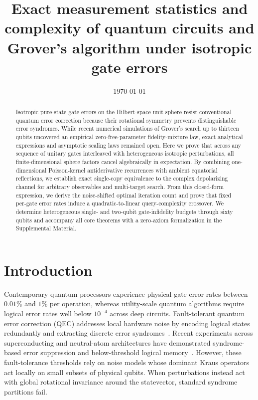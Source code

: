 \title{Exact measurement statistics and complexity of quantum circuits and Grover's algorithm under isotropic gate errors}

\date{\today}

\begin{abstract}
Isotropic pure-state gate errors on the Hilbert-space unit sphere resist conventional quantum error correction because their rotational symmetry prevents distinguishable error syndromes. While recent numerical simulations of Grover's search up to thirteen qubits uncovered an empirical zero-free-parameter fidelity-mixture law, exact analytical expressions and asymptotic scaling laws remained open. Here we prove that across any sequence of unitary gates interleaved with heterogeneous isotropic perturbations, all finite-dimensional sphere factors cancel algebraically in expectation. By combining one-dimensional Poisson-kernel antiderivative recurrences with ambient equatorial reflections, we establish exact single-copy equivalence to the complex depolarizing channel for arbitrary observables and multi-target search. From this closed-form expression, we derive the noise-shifted optimal iteration count and prove that fixed per-gate error rates induce a quadratic-to-linear query-complexity crossover. We determine heterogeneous single- and two-qubit gate-infidelity budgets through sixty qubits and accompany all core theorems with a zero-axiom formalization in the Supplemental Material.
\end{abstract}

\maketitle

\section{Introduction}
\label{sec:intro}

Contemporary quantum processors experience physical gate error rates between $0.01\%$ and $1\%$ per operation, whereas utility-scale quantum algorithms require logical error rates well below $10^{-4}$ across deep circuits. Fault-tolerant quantum error correction (QEC) addresses local hardware noise by encoding logical states redundantly and extracting discrete error syndromes~\cite{NielsenChuang2010,Fowler2012}. Recent experiments across superconducting and neutral-atom architectures have demonstrated syndrome-based error suppression and below-threshold logical memory~\cite{Krinner2022,Bluvstein2024,GoogleQuantumAI2025}. However, these fault-tolerance thresholds rely on noise models whose dominant Kraus operators act locally on small subsets of physical qubits. When perturbations instead act with global rotational invariance around the statevector, standard syndrome partitions fail.


